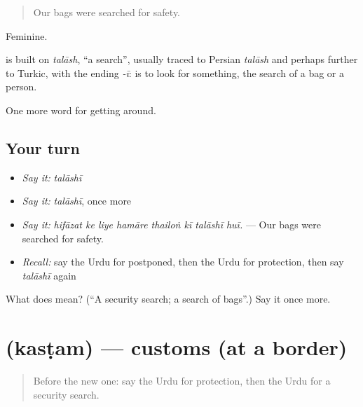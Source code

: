 \begin{quote}
Our bags were searched for safety.
\end{quote}

Feminine.

\begin{cousinweb}
is built on \emph{talāsh}, \textquotedblleft{}a search\textquotedblright{}, usually traced to Persian \emph{talāsh} and perhaps further to Turkic, with the ending \emph{-ī}: \textbf{ } is to look for something, \textbf{} the search of a bag or a person.
\end{cousinweb}

\begin{grammarlens}[title={What you've built}]
One more word for getting around.
\end{grammarlens}

\subsection*{Your turn}
\begin{itemize}
\raggedright
  \item \emph{Say it:} \emph{talāshī}
  \item \emph{Say it:} \emph{talāshī}, once more
  \item \emph{Say it:} \emph{hifāzat ke liye hamāre thailoṅ kī talāshī huī.} — Our bags were searched for safety.
  \item \emph{Recall:} say the Urdu for postponed, then the Urdu for protection, then say \emph{talāshī} again
\end{itemize}

\begin{tcolorbox}[breakable,colback=teal!4,colframe=teal!35!black,title={Before you move on}]
What does  mean? (\textquotedblleft{}A security search; a search of bags\textquotedblright{}.) Say it once more.
\end{tcolorbox}
\section[\texorpdfstring{\ur{کسٹم} (kasṭam)}{کسٹم (kasṭam)}]{ (kasṭam) — customs (at a border)}

\label{lesson:UR-C399-kastam}



\begin{quote}
Before the new one: say the Urdu for protection, then the Urdu for a security search.
\end{quote}

